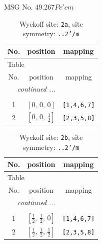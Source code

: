\documentclass[fleqn,8pt]{jsarticle}
\begin{document}
\setcounter{MaxMatrixCols}{32}

\renewcommand{\tablename}{Table~}
\renewcommand{\figurename}{Figure~}
\begin{center}
\LARGE
MSG No. 49.267\quad$Pc'cm$
\end{center}
\renewcommand{\arraystretch}{1.2}
\begin{longtable}{ccc}
\caption{Wyckoff site: {\tt 2a}, site symmetry: {\tt ..2'/m}}
 \\
 \hline \hline
No. & position & mapping \\ \hline \endfirsthead

\multicolumn{2}{l}{\tablename\ \thetable{}} \\
 \hline \hline
No. & position & mapping \\ \hline \endhead

 \hline \hline
\multicolumn{2}{r}{\footnotesize\it continued ...} \\ \endfoot

 \hline \hline
\multicolumn{2}{r}{} \\ \endlastfoot

1 & $\left[ 0,\, 0,\, 0 \right]$ & {\tt [1,4,6,7]} \\ \hline
2 & $\left[ 0,\, 0,\, \frac{1}{2} \right]$ & {\tt [2,3,5,8]} \\
\end{longtable}
\renewcommand{\arraystretch}{1.2}
\begin{longtable}{ccc}
\caption{Wyckoff site: {\tt 2b}, site symmetry: {\tt ..2'/m}}
 \\
 \hline \hline
No. & position & mapping \\ \hline \endfirsthead

\multicolumn{2}{l}{\tablename\ \thetable{}} \\
 \hline \hline
No. & position & mapping \\ \hline \endhead

 \hline \hline
\multicolumn{2}{r}{\footnotesize\it continued ...} \\ \endfoot

 \hline \hline
\multicolumn{2}{r}{} \\ \endlastfoot

1 & $\left[ \frac{1}{2},\, \frac{1}{2},\, 0 \right]$ & {\tt [1,4,6,7]} \\ \hline
2 & $\left[ \frac{1}{2},\, \frac{1}{2},\, \frac{1}{2} \right]$ & {\tt [2,3,5,8]} \\
\end{longtable}
\end{document}
